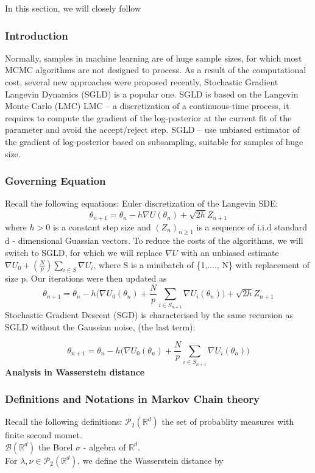 In this section, we will closely follow\ \cite{pitfalls}



\subsubsection{Introduction}

Normally, samples in machine learning are of huge sample sizes, for which most MCMC algorithms are not designed to process. 
As a result of the computational cost, several new approaches were proposed recently, Stochastic Gradient Langevin Dynamics (SGLD) is a popular one. 
SGLD is based on the Langevin Monte Carlo (LMC)
LMC – a discretization of a continuous-time process, it requires to compute the gradient of the log-posterior at the current fit of the parameter and avoid the accept/reject step.
SGLD – use unbiased estimator of the gradient of log-posterior based on subsampling, suitable for samples of huge size. 


\subsubsection{Governing Equation}
Recall the following equations:
Euler discretization of the Langevin SDE:
$$\theta_{n+1} = \theta_n - h \nabla U(\theta_n)+\sqrt{2h} Z_{n+1}$$ where $h > 0$ is a constant step size and $(Z_n)_{n\geq1}$ is a sequence of i.i.d standard d - dimensional Guassian vectors. 
To reduce the costs of the algorithms, we will switch to SGLD, for which we will replace $\nabla U$ with an unbiased estimate $\nabla U_0+(\frac{N}{p}) \sum_{i\in S}\nabla U_i$, where S is a minibatch of \{1,...., N\} with replacement of size p. Our iterations were then updated as
$$\theta_{n+1} = \theta_{n}-h \Bigg (\nabla U_0(\theta_n)+\frac{N}{p}\sum_{i\in S_{n+1}}\nabla U_i(\theta_n)\Bigg )+\sqrt{2h}Z_{n+1}$$
Stochastic Gradient Descent (SGD) is characterised by the same recursion as SGLD without the Gaussian noise, (the last term):


$$\theta_{n+1} = \theta_{n}-h \Bigg (\nabla U_0(\theta_n)+\frac{N}{p}\sum_{i\in S_{n+1}}\nabla U_i(\theta_n)\Bigg)$$
\textbf{Analysis in Wasserstein distance}
\subsubsection{Definitions and Notations in Markov Chain theory}
Recall the following definitions:
$\mathcal{P}_2(\mathbb{R}^d)$ the set of probablity measures with finite second momet.\\
$\mathcal{B}(\mathbb{R}^d)$ the Borel $\sigma$ - algebra of $\mathbb{R}^d$.\\
For $\lambda, \nu \in \mathcal{P}_2(\mathbb{R}^d)$, we define the Wasserstein distance by 

